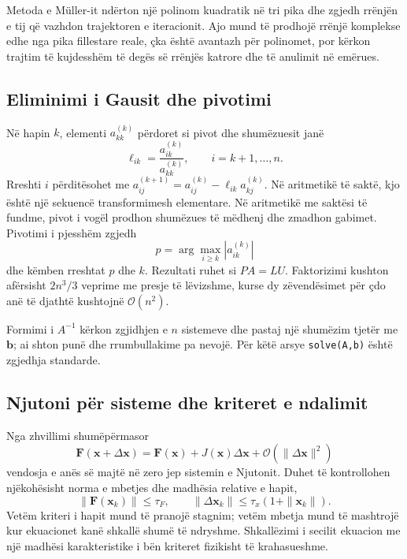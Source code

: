 \documentclass[11pt,oneside,openany]{book}
\newcommand{\vect}[1]{\bm{#1}}
\newcommand{\Oh}{\mathcal{O}}
\begin{document}
Metoda e Müller-it ndërton një polinom kuadratik në tri pika dhe zgjedh rrënjën e tij që vazhdon trajektoren e iteracionit. Ajo mund të prodhojë rrënjë komplekse edhe nga pika fillestare reale, çka është avantazh për polinomet, por kërkon trajtim të kujdesshëm të degës së rrënjës katrore dhe të anulimit në emërues.

\subsection{Eliminimi i Gausit dhe pivotimi}
Në hapin $k$, elementi $a_{kk}^{(k)}$ përdoret si pivot dhe shumëzuesit janë
\begin{equation}
 \ell_{ik}=\frac{a_{ik}^{(k)}}{a_{kk}^{(k)}},\qquad i=k+1,\ldots,n.
\end{equation}
Rreshti $i$ përditësohet me $a_{ij}^{(k+1)}=a_{ij}^{(k)}-\ell_{ik}a_{kj}^{(k)}$. Në aritmetikë të saktë, kjo është një sekuencë transformimesh elementare. Në aritmetikë me saktësi të fundme, pivot i vogël prodhon shumëzues të mëdhenj dhe zmadhon gabimet. Pivotimi i pjesshëm zgjedh
\begin{equation}
 p=\arg\max_{i\ge k}|a_{ik}^{(k)}|
\end{equation}
dhe këmben rreshtat $p$ dhe $k$. Rezultati ruhet si $PA=LU$. Faktorizimi kushton afërsisht $2n^3/3$ veprime me presje të lëvizshme, kurse dy zëvendësimet për çdo anë të djathtë kushtojnë $\Oh(n^2)$.

Formimi i $A^{-1}$ kërkon zgjidhjen e $n$ sistemeve dhe pastaj një shumëzim tjetër me $\vect b$; ai shton punë dhe rrumbullakime pa nevojë. Për këtë arsye \texttt{solve(A,b)} është zgjedhja standarde.

\subsection{Njutoni për sisteme dhe kriteret e ndalimit}
Nga zhvillimi shumëpërmasor
\begin{equation}
 \vect F(\vect x+\Delta\vect x)=\vect F(\vect x)+J(\vect x)\Delta\vect x+\Oh(\|\Delta\vect x\|^2)
\end{equation}
vendosja e anës së majtë në zero jep sistemin e Njutonit. Duhet të kontrollohen njëkohësisht norma e mbetjes dhe madhësia relative e hapit,
\begin{equation}
 \|\vect F(\vect x_k)\|\le\tau_F,
 \qquad
 \|\Delta\vect x_k\|\le\tau_x(1+\|\vect x_k\|).
\end{equation}
Vetëm kriteri i hapit mund të pranojë stagnim; vetëm mbetja mund të mashtrojë kur ekuacionet kanë shkallë shumë të ndryshme. Shkallëzimi i secilit ekuacion me një madhësi karakteristike i bën kriteret fizikisht të krahasueshme.
\end{document}
